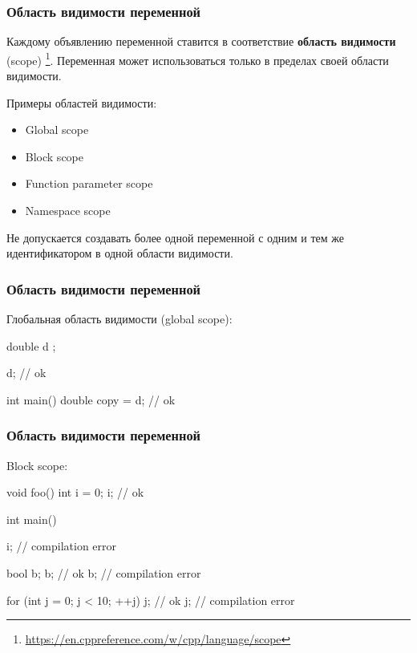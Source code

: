 \documentclass[compress, 8pt, aspectratio=169]{beamer}
\begin{document}
\begin{frame}[fragile]

    \frametitle{Область видимости переменной}

    Каждому объявлению переменной ставится в соответствие
    \textbf{область видимости} (scope)
    \footnote{\url{https://en.cppreference.com/w/cpp/language/scope}}.
    Переменная может использоваться только в пределах своей области
    видимости.

    \hfill \break
    Примеры областей видимости:

    \begin{itemize}
        \item Global scope
        \item Block scope
        \item Function parameter scope
        \item Namespace scope
    \end{itemize}

    \hfill \break
    Не допускается создавать более одной переменной с одним и тем же
    идентификатором в одной области видимости.


\end{frame}

\begin{frame}[fragile]

    \frametitle{Область видимости переменной}

    Глобальная область видимости (global scope):

    \begin{myinplacelisting}[minted language=cpp]
double d {};

d; // ok

int main() {
    double copy = d; // ok
}
    \end{myinplacelisting}

\end{frame}

\begin{frame}[fragile]

    \frametitle{Область видимости переменной}

    Block scope:

    \begin{myinplacelisting}[minted language=cpp]
void foo() {
    int i = 0;
    i; // ok
}

int main() {
    i; // compilation error

    {
        bool b;
        b; // ok
    }
    b; // compilation error

    for (int j = 0; j < 10; ++j) {
        j; // ok
    }
    j; // compilation error
}
    \end{myinplacelisting}

\end{frame}
\end{document}
